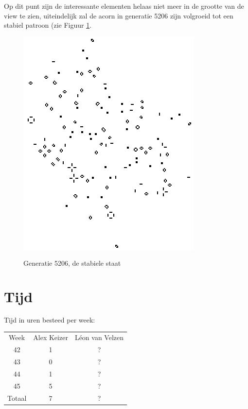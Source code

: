 \documentclass[10pt]{article}
\begin{document}
Op dit punt zijn de interessante elementen helaas niet meer in de grootte van de view te zien, uiteindelijk zal de acorn in generatie 5206 zijn volgroeid tot een stabiel patroon (zie Figuur \ref{fig:final}.

\begin{figure}[!ht]
\begin{center}
{\includegraphics[scale=0.5]{Acorn_final.png}}
\caption{Generatie 5206, de stabiele staat \cite{acorn}}\label{fig:final}
\end{center}
\end{figure}

\newpage

\section{Tijd}

Tijd in uren besteed per week:

\begin{center}
\begin{tabular}{ |c|c|c| }
\hline
Week & Alex Keizer & L\'{e}on van Velzen \\
42 & 1 & ? \\
43 & 0 & ? \\
44 & 1 & ? \\
45 & 5 & ? \\ 
\hline
Totaal & 7 & ? \\
\hline
\end{tabular}
\end{center}
\end{document}

